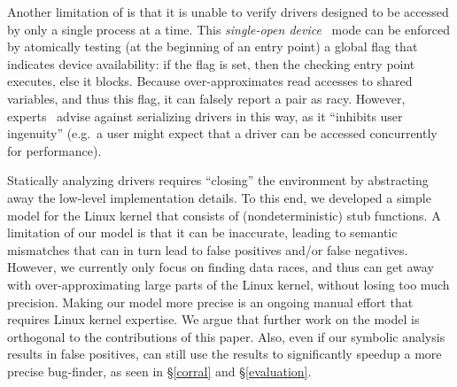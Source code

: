 Another limitation of \whoop is that it is unable to verify drivers designed to be accessed by only a single process at a time. This \emph{single-open device}~\cite[p.\ 173]{corbet2005linux} mode can be enforced by atomically testing (at the beginning of an entry point) a global flag that indicates device availability: if the flag is set, then the checking entry point executes, else it blocks. Because \whoop over-approximates read accesses to shared variables, and thus this flag, it can falsely report a pair as racy. However, experts~\cite[p.\ 173]{corbet2005linux} advise against serializing drivers in this way, as it ``inhibits user ingenuity'' (e.g.\ a user might expect that a driver can be accessed concurrently for performance).

Statically analyzing drivers requires ``closing'' the environment by abstracting away the low-level implementation details. To this end, we developed a simple model for the Linux kernel that consists of (nondeterministic) stub functions.
%
A limitation of our model is that it can be inaccurate, leading to semantic mismatches that can in turn lead to false positives and/or false negatives.
%
However, we currently only focus on finding data races, and thus can get away with over-approximating large parts of the Linux kernel, without losing too much precision. Making our model more precise is an ongoing manual effort that requires Linux kernel expertise. We argue that further work on the model is orthogonal to the contributions of this paper. Also, even if our symbolic analysis results in false positives, \whoop can still use the results to significantly speedup a more precise bug-finder, as seen in \S\ref{corral} and \S\ref{evaluation}.
